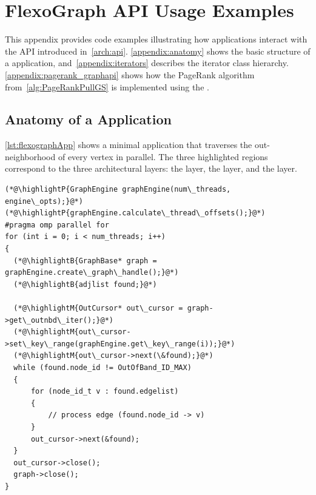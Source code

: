 \chapter{FlexoGraph API Usage Examples}
\label{chap:appendix:api}

This appendix provides code examples illustrating how applications interact with the \project{} API introduced in~\autoref{arch:api}.
\autoref{appendix:anatomy} shows the basic structure of a \project{} application, and~\autoref{appendix:iterators} describes the iterator class hierarchy.
\autoref{appendix:pagerank_graphapi} shows how the PageRank algorithm from~\autoref{alg:PageRankPullGS} is implemented using the \api{}.

\section{Anatomy of a \project{} Application}
\label{appendix:anatomy}

\autoref{lst:flexographApp} shows a minimal application that traverses the out-neighborhood of every vertex in parallel.
The three highlighted regions correspond to the three architectural layers: the  layer, the  layer, and the  layer.

\begin{lstlisting}[style=cpp,label=lst:flexographApp,caption={Example application using the \api{} to scan out-neighborhoods in parallel.  \highlightP{GraphEngine} owns the connection and computes partitions; \highlightB{GraphBase} provides a per-thread handle; \highlightM{OutCursor} iterates a partition's neighborhoods.},captionpos=b]
(*@\highlightP{GraphEngine graphEngine(num\_threads, engine\_opts);}@*)
(*@\highlightP{graphEngine.calculate\_thread\_offsets();}@*)
#pragma omp parallel for
for (int i = 0; i < num_threads; i++)
{
  (*@\highlightB{GraphBase* graph = graphEngine.create\_graph\_handle();}@*)
  (*@\highlightB{adjlist found;}@*)

  (*@\highlightM{OutCursor* out\_cursor = graph->get\_outnbd\_iter();}@*)
  (*@\highlightM{out\_cursor->set\_key\_range(graphEngine.get\_key\_range(i));}@*)
  (*@\highlightM{out\_cursor->next(\&found);}@*)
  while (found.node_id != OutOfBand_ID_MAX)
  {
      for (node_id_t v : found.edgelist)
      {
          // process edge (found.node_id -> v)
      }
      out_cursor->next(&found);
  }
  out_cursor->close();
  graph->close();
}
\end{lstlisting}

